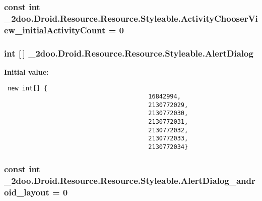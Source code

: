 \hypertarget{class__2doo_1_1_droid_1_1_resource_1_1_styleable_7950113a506d2e7dcf1464e4aa66e741}{
\subsubsection[{ActivityChooserView\_\-initialActivityCount}]{\setlength{\rightskip}{0pt plus 5cm}const int \_\-2doo.Droid.Resource.Resource.Styleable.ActivityChooserView\_\-initialActivityCount = 0}}
\label{class__2doo_1_1_droid_1_1_resource_1_1_styleable_7950113a506d2e7dcf1464e4aa66e741}


\hypertarget{class__2doo_1_1_droid_1_1_resource_1_1_styleable_323e6663bc62326c0df7d18a1fe9b215}{
\subsubsection[{AlertDialog}]{\setlength{\rightskip}{0pt plus 5cm}int \mbox{[}$\,$\mbox{]} \_\-2doo.Droid.Resource.Resource.Styleable.AlertDialog}}
\label{class__2doo_1_1_droid_1_1_resource_1_1_styleable_323e6663bc62326c0df7d18a1fe9b215}


\textbf{Initial value:}

\begin{Code}\begin{verbatim} new int[] {
                                        16842994,
                                        2130772029,
                                        2130772030,
                                        2130772031,
                                        2130772032,
                                        2130772033,
                                        2130772034}
\end{verbatim}
\end{Code}
\hypertarget{class__2doo_1_1_droid_1_1_resource_1_1_styleable_f0becc9b1ab89fad9c3d38039a1bda53}{
\subsubsection[{AlertDialog\_\-android\_\-layout}]{\setlength{\rightskip}{0pt plus 5cm}const int \_\-2doo.Droid.Resource.Resource.Styleable.AlertDialog\_\-android\_\-layout = 0}}
\label{class__2doo_1_1_droid_1_1_resource_1_1_styleable_f0becc9b1ab89fad9c3d38039a1bda53}


